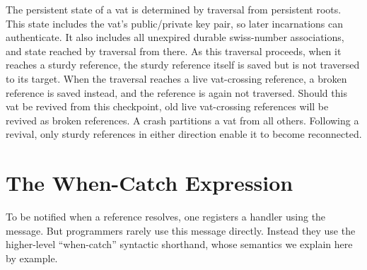 \documentclass{llncs}
\begin{document}
The persistent state of a vat is determined by traversal from
persistent roots. This state includes the vat's public/private key
pair, so later incarnations can authenticate. It also includes all
unexpired durable swiss-number associations, and state reached by
traversal from there. As this traversal proceeds, when it reaches a
sturdy reference, the sturdy reference itself is saved but is not
traversed to its target. When the traversal reaches a live
vat-crossing reference, a broken reference is saved instead, and the
reference is again not traversed. Should this vat be revived from this
checkpoint, old live vat-crossing references will be revived as broken
references. A crash partitions a vat from all others. Following a
revival, only sturdy references in either direction enable it to
become reconnected.

\section{The When-Catch Expression}

To be notified when a reference resolves, one registers a handler
using the  message. But programmers rarely
use this message directly. Instead they use the higher-level
``when-catch'' syntactic shorthand, whose semantics we explain here by
example.
\end{document}
